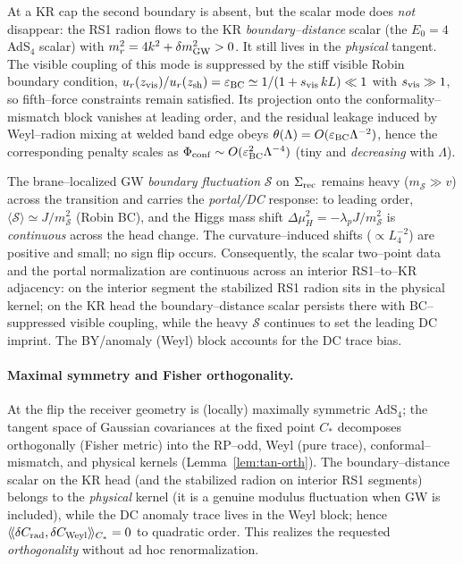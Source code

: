 \documentclass[10pt]{article}
\theoremstyle{definition}
\theoremstyle{plain}
\begin{document}
At a KR cap the second boundary is absent, but the scalar mode does \emph{not} disappear: the RS1 radion flows to the KR
\emph{boundary–distance} scalar (the $E_0=4$ AdS$_4$ scalar) with $m_r^2=4k^2+\delta m_{\rm GW}^2>0$. It still lives in the
\emph{physical} tangent. The visible coupling of this mode is suppressed by the stiff visible Robin boundary condition,
$u_r(z_{\rm vis})/u_r(z_{\rm sh})=\varepsilon_{\rm BC}\simeq 1/(1+s_{\rm vis}\,kL)\ll 1$ with $s_{\rm vis}\gg1$, so fifth–force
constraints remain satisfied. Its projection onto the conformality–mismatch block vanishes at leading order, and the residual
leakage induced by Weyl–radion mixing at welded band edge obeys
$\theta(\Lambda)=O(\varepsilon_{\rm BC}\Lambda^{-2})$, hence the corresponding penalty scales as
$\Phi_{\rm conf}\sim O(\varepsilon_{\rm BC}^{2}\Lambda^{-4})$ (tiny and \emph{decreasing} with $\Lambda$).

The brane–localized GW \emph{boundary fluctuation} $\mathcal S$ on $\Sigma_{\rm rec}$ remains heavy ($m_{\mathcal S}\gg v$) across
the transition and carries the \emph{portal/DC} response: to leading order,
$\langle \mathcal S\rangle\simeq J/m_{\mathcal S}^2$ (Robin BC), and the Higgs mass shift
$\Delta\mu_H^2=-\lambda_p J/m_{\mathcal S}^2$ is \emph{continuous} across the head change. The curvature–induced shifts
($\propto L_4^{-2}$) are positive and small; no sign flip occurs. Consequently, the scalar two–point data and the portal normalization
are continuous across an interior RS1--to--KR adjacency: on the interior segment the stabilized RS1 radion sits in the physical kernel;
on the KR head the boundary–distance scalar persists there with BC–suppressed visible coupling, while the heavy $\mathcal S$ continues
to set the leading DC imprint. The BY/anomaly (Weyl) block accounts for the DC trace bias.



\paragraph{Maximal symmetry and Fisher orthogonality.}\label{par:uom-main-087}
At the flip the receiver geometry is (locally) maximally symmetric AdS$_4$; the tangent space of Gaussian covariances at the fixed point $C_\ast$ decomposes orthogonally (Fisher metric) into the RP–odd, Weyl (pure trace), conformal–mismatch, and physical kernels (Lemma~\ref{lem:tan-orth}).
The boundary–distance scalar on the KR head (and the stabilized radion on interior RS1 segments) belongs to the \emph{physical} kernel
(it is a genuine modulus fluctuation when GW is included), while the DC anomaly trace lives in the Weyl block; hence
\(
\langle\!\langle \delta C_{\rm rad},\delta C_{\rm Weyl}\rangle\!\rangle_{C_\ast}=0
\)
to quadratic order. This realizes the requested \emph{orthogonality} without ad hoc renormalization.
\end{document}
